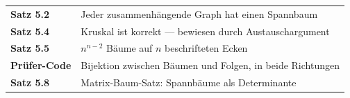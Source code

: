 \begin{merksatz}
\begin{center}
\renewcommand{\arraystretch}{1.5}
\begin{tabular}{@{}P{3.0cm}P{5.6cm}@{}}
\toprule
\textbf{Satz 5.2} & Jeder zusammenhängende Graph hat einen Spannbaum\\
\textbf{Satz 5.4} & Kruskal ist korrekt --- bewiesen durch Austauschargument\\
\textbf{Satz 5.5} & $n^{n-2}$ Bäume auf $n$ beschrifteten Ecken\\
\textbf{Prüfer-Code} & Bijektion zwischen Bäumen und Folgen, in beide Richtungen\\
\textbf{Satz 5.8} & Matrix-Baum-Satz: Spannbäume als Determinante\\
\bottomrule
\end{tabular}
\end{center}

\begin{center}
\begin{minipage}{0.88\textwidth}
\end{minipage}
\end{center}
\end{merksatz}

